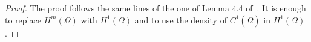\documentclass[reqno]{amsart}
\theoremstyle{definition}
\numberwithin{equation}{section}
\def\de {\mathrm{d}}
\begin{document}
\begin{proof}
The proof follows the same lines of the one of Lemma 4.4 of~\cite{CrLa}. It is enough to replace $H^m(\Omega)$ with $H^1(\Omega)$ and to use the density of $C^1(\overline\Omega)$ in $H^1(\Omega)$. 

\end{proof}
\end{document}
